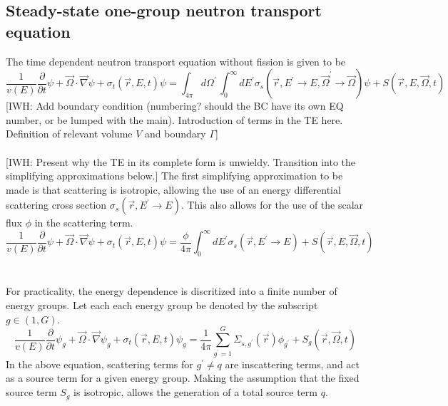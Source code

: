 \documentclass{article}
\newcommand{\vr}{\vec{r}}
\newcommand{\vO}{\vec{\Omega}}
\newcommand{\vgrad}{\vec{\nabla}}
\newcommand{\sigt}{\sigma_t}
\newcommand{\sigs}{\sigma_s}
\begin{document}
\subsection{Steady-state one-group neutron transport equation}

The time dependent neutron transport equation without fission is given to be 
\begin{equation}
\frac{1}{v(E)} \frac{\partial}{\partial t}\psi + \vO \cdot \vgrad \psi + \sigt(\vr,E,t) \psi = \int_{4 \pi} d \Omega^\prime \, \int_0^\infty dE^\prime \sigs(\vr,E^\prime \to E, \vO^\prime \to \vO) \psi + S(\vr,E,\vO,t) 
\end{equation}
{\color{red}[IWH: Add boundary condition (numbering? should the BC have its own EQ number, or be lumped with the main). Introduction of terms in the TE here. Definition of relevant volume $V$ and boundary $\Gamma$]}
\\ \\
{\color{red}[IWH: Present why the TE in its complete form is unwieldy. Transition into the simplifying approximations below.]}
The first simplifying approximation to be made is that scattering is isotropic, allowing the use of an energy differential scattering cross section $\sigs(\vr,E^\prime \to E)$. This also allows for the use of the scalar flux $\phi$ in the scattering term.
\begin{equation}
\frac{1}{v(E)} \frac{\partial}{\partial t}\psi + \vO \cdot \vgrad \psi + \sigt(\vr,E,t) \psi = \frac{\phi}{4 \pi} \int_0^\infty dE^\prime \sigs(\vr,E^\prime \to E) + S(\vr,E,\vO,t) 
\end{equation}
 \\ \\
For practicality, the energy dependence is discritized into a finite number of energy groups. Let each each energy group be denoted by the subscript $g \in (1,G)$. 
\begin{equation}
\frac{1}{v(E)} \frac{\partial}{\partial t}\psi_g + \vO \cdot \vgrad \psi_g + \sigt(\vr,E,t) \psi_g = \frac{1}{4 \pi} \sum_{g^\prime=1}^G  \Sigma_{s,g^\prime}(\vr) \phi_{g^\prime} + S_g(\vr,\vO,t) 
\end{equation}
In the above equation, scattering terms for $g^\prime \neq q$ are inscattering terms, and act as a source term for a given energy group. Making the assumption that the fixed source term $S_g$ is isotropic, allows the generation of a total source term $q$.
\end{document}
